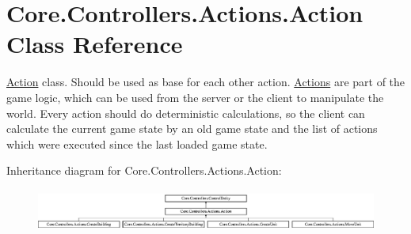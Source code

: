 \hypertarget{classCore_1_1Controllers_1_1Actions_1_1Action}{}\section{Core.\+Controllers.\+Actions.\+Action Class Reference}
\label{classCore_1_1Controllers_1_1Actions_1_1Action}


\hyperlink{classCore_1_1Controllers_1_1Actions_1_1Action}{Action} class. Should be used as base for each other action. \hyperlink{namespaceCore_1_1Controllers_1_1Actions}{Actions} are part of the game logic, which can be used from the server or the client to manipulate the world. Every action should do deterministic calculations, so the client can calculate the current game state by an old game state and the list of actions which were executed since the last loaded game state.  


Inheritance diagram for Core.\+Controllers.\+Actions.\+Action\+:\begin{figure}[H]
\begin{center}
\leavevmode
\includegraphics[height=1.418919cm]{classCore_1_1Controllers_1_1Actions_1_1Action}
\end{center}
\end{figure}
